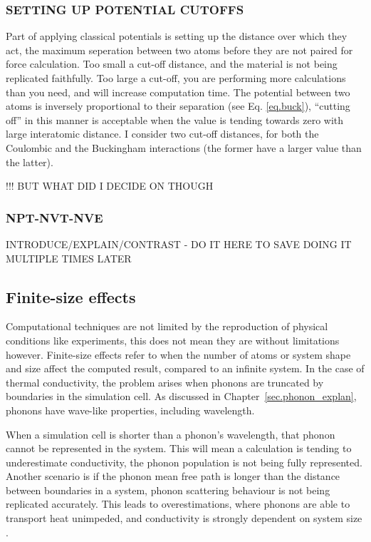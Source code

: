 \subsubsection{SETTING UP POTENTIAL CUTOFFS}

Part of applying classical potentials is setting up the distance over which they act, the maximum seperation between two atoms before they are not paired for force calculation. Too small a cut-off distance, and the material is not being replicated faithfully. Too large a cut-off, you are performing more calculations than you need, and will increase computation time. The potential between two atoms is inversely proportional to their separation (see Eq. \ref{eq.buck}), ``cutting off'' in this manner is acceptable when the value is tending towards zero with large interatomic distance. I consider two cut-off distances, for both the Coulombic and the Buckingham interactions (the former have a larger value than the latter).

 !!! BUT WHAT DID I DECIDE ON THOUGH 


\subsubsection{NPT-NVT-NVE}

INTRODUCE/EXPLAIN/CONTRAST - DO IT HERE TO SAVE DOING IT MULTIPLE TIMES LATER







\subsection{Finite-size effects}

Computational techniques are not limited by the reproduction of physical conditions like experiments, this does not mean they are without limitations however. Finite-size effects refer to when the number of atoms or system shape and size affect the computed result, compared to an infinite system. In the case of thermal conductivity, the problem arises when phonons are truncated by boundaries in the simulation cell. As discussed in Chapter~\ref{sec.phonon_explan}, phonons have wave-like properties, including wavelength. 

When a simulation cell is shorter than a phonon's wavelength, that phonon cannot be represented in the system. This will mean a calculation is tending to underestimate conductivity, the phonon population is not being fully represented. Another scenario is if the phonon mean free path is longer than the distance between boundaries in a system, phonon scattering behaviour is not being replicated accurately. This leads to overestimations, where phonons are able to transport heat unimpeded, and conductivity is strongly dependent on system size \citep{Tadano2014}. 

